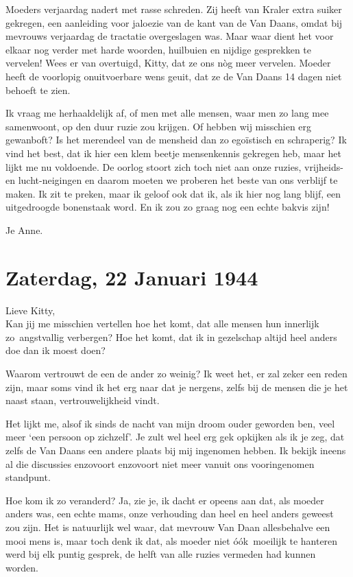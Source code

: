 \documentclass{book}
\begin{document}
Moeders verjaardag nadert met rasse schreden. Zij heeft van Kraler extra suiker
gekregen, een aanleiding voor jaloezie van de kant van de Van Daans, omdat bij
mevrouws verjaardag de tractatie overgeslagen was. Maar waar dient het voor
elkaar nog verder met harde woorden, huilbuien en nijdige gesprekken te
vervelen! Wees er van overtuigd, Kitty, dat ze ons nòg meer vervelen. Moeder
heeft de voorlopig onuitvoerbare wens geuit, dat ze de Van Daans 14 dagen niet
behoeft te zien.

Ik vraag me herhaaldelijk af, of men met alle mensen, waar men zo lang mee
samenwoont, op den duur ruzie zou krijgen. Of hebben wij misschien erg
gewanboft? Is het merendeel van de mensheid dan zo egoïstisch en schraperig? Ik
vind het best, dat ik hier een klem beetje mensenkennis gekregen heb, maar het
lijkt me nu voldoende. De oorlog stoort zich toch niet aan onze ruzies,
vrijheids- en lucht-neigingen en daarom moeten we proberen het beste van ons
verblijf te maken. Ik zit te preken, maar ik geloof ook dat ik, als ik hier nog
lang blijf, een uitgedroogde bonenstaak word. En ik zou zo graag nog een echte
bakvis zijn!

Je Anne.

\section*{Zaterdag, 22 Januari 1944}

Lieve Kitty,\\
Kan jij me misschien vertellen hoe het komt, dat alle mensen hun
innerlijk zo~angstvallig verbergen? Hoe het komt, dat ik in gezelschap altijd
heel anders doe dan ik moest doen?

Waarom vertrouwt de een de ander zo weinig? Ik weet het, er zal zeker een reden
zijn, maar soms vind ik het erg naar dat je nergens, zelfs bij de mensen die je
het naast staan, vertrouwelijkheid vindt.

Het lijkt me, alsof ik sinds de nacht van mijn droom ouder geworden ben, veel
meer `een persoon op zichzelf'. Je zult wel heel erg gek opkijken als ik je zeg,
dat zelfs de Van Daans een andere plaats bij mij ingenomen hebben. Ik bekijk
ineens al die discussies enzovoort enzovoort niet meer vanuit ons vooringenomen
standpunt.

Hoe kom ik zo veranderd? Ja, zie je, ik dacht er opeens aan dat, als moeder
anders was, een echte mams, onze verhouding dan heel en heel anders geweest zou
zijn. Het is natuurlijk wel waar, dat mevrouw Van Daan allesbehalve een mooi
mens is, maar toch denk ik dat, als moeder niet óók~moeilijk te hanteren werd
bij elk puntig gesprek, de helft van alle ruzies vermeden had kunnen worden.
\end{document}
